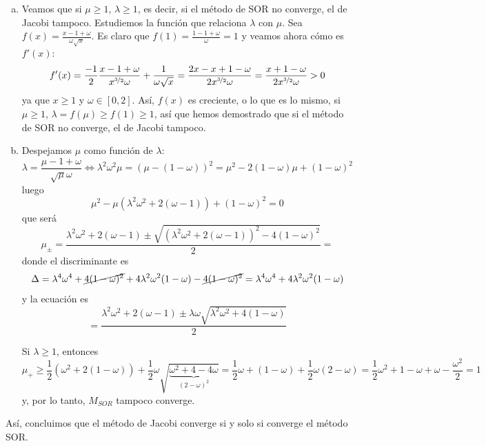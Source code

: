 \begin{obs}
        \begin{enumerate}[a)]
            \item Veamos que si $\mu \geq 1$, $\lambda \geq 1$, es decir, si el método de SOR no converge, el de Jacobi tampoco. Estudiemos la función que relaciona $\lambda$ con $\mu$. Sea $f(x)=\frac{x-1+\omega}{\omega \sqrt{x}}$. Es claro que $f(1)=\frac{1-1+\omega}{\omega}=1$ y veamos ahora cómo es $f'(x)$:
            $$f'(x)=\dfrac{-1}{2} \dfrac{x-1+\omega}{x^{\nicefrac{3}{2}}\omega} + \dfrac{1}{\omega \sqrt{x}} = \dfrac{2x-x+1-\omega}{2x^{\nicefrac{3}{2}}\omega}=\dfrac{x+1-\omega}{2x^{\nicefrac{3}{2}}\omega} > 0$$
            ya que $x \geq 1$ y $\omega \in [0,2]$. Así, $f(x)$ es creciente, o lo que es lo mismo, si $\mu \geq 1$, $\lambda=f(\mu)\geq f(1) \geq 1$, así que hemos demostrado que si el método de SOR no converge, el de Jacobi tampoco.
            \item Despejamos $\mu$ como función de $\lambda$:
             $$\lambda=\dfrac{\mu - 1+ \omega }{\sqrt{\mu} \omega} \iff \lambda^2 \omega^2 \mu = (\mu-(1-\omega))^2=\mu^2 - 2(1-\omega)\mu + (1-\omega)^2$$
             luego
             $$\mu^2- \mu (\lambda^2 \omega^2 +2(\omega -1)) + (1-\omega)^2=0$$
             que será
             $$\mu_{\pm}=\dfrac{\lambda^2 \omega^2 +2(\omega -1)\pm \sqrt{(\lambda^2 \omega^2 +2(\omega -1))^2 - 4(1-\omega)^2 }}{2} = $$
             donde el discriminante es 
            $$\Delta=\lambda^4 \omega^4 + \cancel{4(1-\omega)^2} + 4 \lambda^2 \omega^2 (1-\omega) -\cancel{4(1-\omega)^2}=\lambda^4 \omega^4  + 4 \lambda^2 \omega^2 (1-\omega) $$
            y la ecuación es 
            $$=\dfrac{\lambda^2 \omega^2 +2(\omega -1)\pm\lambda \omega \sqrt{\lambda^2 \omega^2 + 4(1-\omega) }}{2} $$

            Si $\lambda  \geq 1$, entonces
            $$\mu_+ \geq \dfrac{1}{2}(\omega^2 + 2(1-\omega)) + \dfrac{1}{2} \omega \sqrt{\underbrace{\omega^2 + 4 - 4\omega}_{(2-\omega)^2}}=\dfrac{1}{2}\omega +(1-\omega) + \dfrac{1}{2} \omega (2-\omega) = \dfrac{1}{2}\omega^2 + 1-\omega + \omega - \dfrac{\omega^2}{2}=1$$
            y, por lo tanto, $M_{SOR}$ tampoco converge.
        \end{enumerate}
        Así, concluimos que el método de Jacobi converge si y solo si converge el método SOR.
    \end{obs}


    
\vfill







